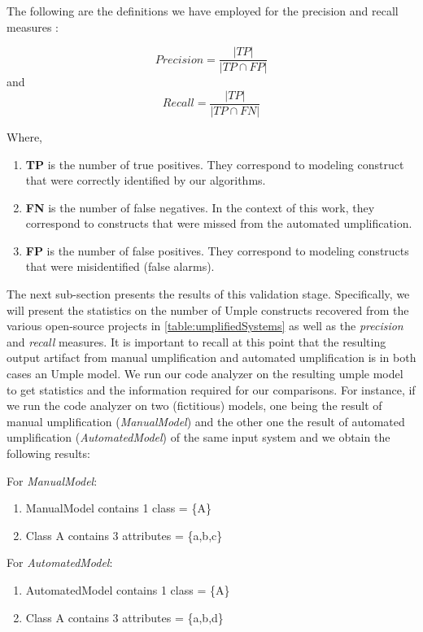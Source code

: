 The following are the definitions we have employed for the precision and recall measures \cite{precisionRecallDef}:

\[  Precision=\frac{|TP|}{|TP \cap FP|}\]
and \\
\[  Recall=\frac{|TP|}{|TP \cap FN|}\]

Where,
\begin{enumerate}
\label{sec:tuning}
\item \textbf{TP} is the number of true positives. They correspond to modeling construct that were correctly identified by our algorithms.
\item \textbf{FN} is the number of false negatives.  In the context of this work, they correspond to constructs that were missed from the automated umplification. 
\item \textbf{FP} is the number of false positives. They correspond to modeling constructs that were misidentified (false alarms). 
\end{enumerate}

The next sub-section presents the results of this validation stage. Specifically, we will present the statistics on the number of Umple constructs recovered from the various open-source projects in \ref{table:umplifiedSystems} as well as the \textit{precision} and \textit{recall} measures. It is important to recall at this point that the resulting output artifact from manual umplification and automated umplification is in both cases an Umple model. We run our code analyzer on the resulting umple model to get statistics and the information required for our comparisons. For instance, if we run the code analyzer on two (fictitious) models, one being the result of manual umplification (\textit{ManualModel}) and the other one the result of automated umplification (\textit{AutomatedModel}) of the same input system and we obtain the following results:

For \textit{ManualModel}:
\begin{enumerate}
\item ManualModel contains 1 class = \{A\}
\item Class A contains 3 attributes = \{a,b,c\}
\end{enumerate}

For \textit{AutomatedModel}:
\begin{enumerate}
\item AutomatedModel contains 1 class = \{A\}
\item Class A contains 3 attributes = \{a,b,d\}
\end{enumerate}


